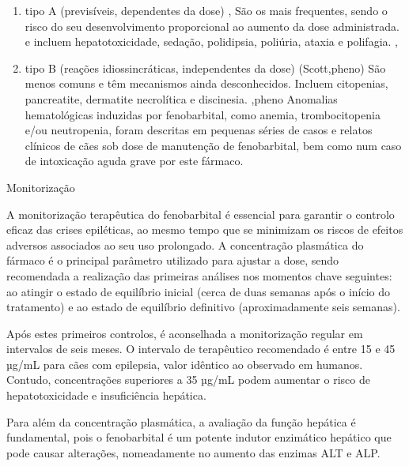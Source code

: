 \begin{enumerate}
    \item	tipo A \cite{Bersan2014}\cite{10.11} (previsíveis, dependentes da dose) \cite{Scott2021},\cite{Bersan2014} São os mais frequentes, sendo o risco do seu desenvolvimento proporcional ao aumento da dose administrada. \cite{Scott2021} e incluem hepatotoxicidade, sedação, polidipsia, poliúria, ataxia e polifagia. \cite{Scott2021},\cite{Bersan2014}
    \item tipo B \cite{Bersan2014}\cite{10.11} (reações idiossincráticas, independentes da dose) (Scott,pheno) São menos comuns e têm mecanismos ainda desconhecidos.\cite{Scott2021} Incluem citopenias, pancreatite, dermatite necrolítica e discinesia. \cite{Scott2021},pheno Anomalias hematológicas induzidas por fenobarbital, como anemia, trombocitopenia e/ou neutropenia, foram descritas em pequenas séries de casos e relatos clínicos de cães sob dose de manutenção de fenobarbital, bem como num caso de intoxicação aguda grave por este fármaco.\cite{Bersan2014}

\end{enumerate}

Monitorização


A monitorização terapêutica do fenobarbital é essencial para garantir o controlo eficaz das crises epiléticas, ao mesmo tempo que se minimizam os riscos de efeitos adversos associados ao seu uso prolongado.\cite{10.11} A concentração plasmática do fármaco é o principal parâmetro utilizado para ajustar a dose, sendo recomendada a realização das primeiras análises nos momentos chave seguintes: ao atingir o estado de equilíbrio inicial (cerca de duas semanas após o início do tratamento) e ao estado de equilíbrio definitivo (aproximadamente seis semanas).\cite{Podell2016} 


Após estes primeiros controlos, é aconselhada a monitorização regular em intervalos de seis meses. O intervalo de terapêutico recomendado é entre 15 e 45 µg/mL para cães com epilepsia, \cite{10.11}\cite{Trinka2023} valor idêntico ao observado em humanos. Contudo, concentrações superiores a 35 µg/mL podem aumentar o risco de hepatotoxicidade e insuficiência hepática.\cite{10.11}\cite{Jukier2023}\cite{Chandler2011}


Para além da concentração plasmática, a avaliação da função hepática é fundamental, pois o fenobarbital é um potente indutor enzimático hepático que pode causar alterações, nomeadamente no aumento das enzimas ALT e ALP. \cite{Gieger2000,hep} 


